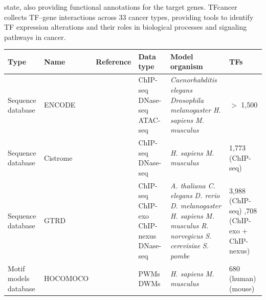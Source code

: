 \documentclass[a4paper, titlepage, openright]{book}
\begin{document}
state, also providing functional annotations for the target genes. TFcancer \citep{huang2021tfcancer} collects TF–gene interactions across 33 cancer types, providing tools to identify TF expression alterations and their roles in biological processes and signaling pathways in cancer.
\begin{longtable}{|p{2cm}|p{2cm}|p{3cm}|p{2cm}|p{4cm}|p{2cm}|}
		\hline
		\textbf{Type}& \textbf{Name}&\textbf{Reference}&\textbf{Data type}& \textbf{Model organism}& \textbf{TFs} \\
		\hline
		Sequence database & ENCODE & \citep{encode2012integrated} & ChIP-seq \newline DNase-seq \newline ATAC-seq & \emph{Caenorhabditis elegans} \newline \emph{Drosophila melanogaster} \newline \emph{H. sapiens} \newline \emph{M. musculus} & $>$ 1,500 \\
		\hline
		Sequence database & Cistrome & \citep{zheng2019cistrome} & ChIP-seq \newline DNase-seq & \emph{H. sapiens} \newline \emph{M. musculus} & 1,773 (ChIP-seq) \\
		\hline
		Sequence database & GTRD & \citep{kolmykov2021gtrd} & ChIP-seq \newline ChIP-exo \newline ChIP-nexus \newline DNase-seq & \emph{A. thaliana} \newline \emph{C. elegans} \newline \emph{D. rerio}  \newline \emph{D. melanogaster} \newline \emph{H. sapiens} \newline \emph{M. musculus} \newline \emph{R. norvegicus} \newline \emph{S. cerevisiae} \newline \emph{S. pombe}  & 3,988 (ChIP-seq) \newline 1,708 (ChIP-exo + ChIP-nexus) \\
		\hline
		Motif models database & HOCOMOCO & \citep{kulakovskiy2013hocomoco, kulakovskiy2018hocomoco} & PWMs \newline DWMs & \emph{H. sapiens} \newline \emph{M. musculus} & 680 (human) \newline 453 (mouse) \\

\end{longtable}
\end{document}
